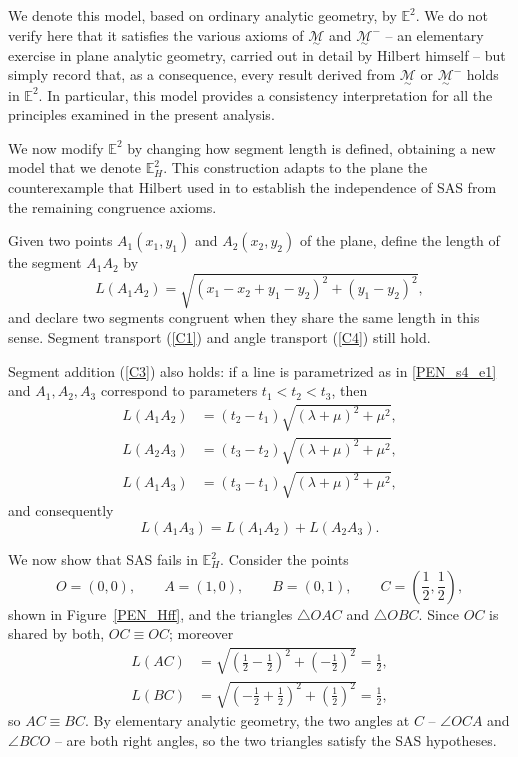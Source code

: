 \documentclass[11pt,a4paper]{article}
\theoremstyle{definition}
\theoremstyle{remark}
\numberwithin{equation}{section}
\newcommand{\MG}{\underset{\sim}{\mathcal{M}}} %
\begin{document}
We denote this model, based on ordinary analytic geometry, by $\mathbb{E}^{2}$. We do not
verify here that it satisfies the various axioms of $\MG$ and $\MG^{-}$ -- an elementary
exercise in plane analytic geometry, carried out in detail by Hilbert himself
\cite[\S 9]{Hilbert1950} -- but simply record that, as a consequence, every result derived
from $\MG$ or $\MG^{-}$ holds in $\mathbb{E}^{2}$.
In particular, this model provides a consistency interpretation for all the principles examined
in the present analysis.

We now modify $\mathbb{E}^{2}$ by changing how segment length is defined, obtaining a new model
that we denote $\mathbb{E}_{H}^{2}$. This construction adapts to the plane the counterexample
that Hilbert used in \cite[\S 11]{Hilbert1950} to establish the independence of SAS from the
remaining congruence axioms.

Given two points $A_{1}(x_{1},y_{1})$ and $A_{2}(x_{2},y_{2})$ of the plane, define the length
of the segment $A_1A_2$ by
\begin{equation*}
L(A_{1}A_{2})=
\sqrt{(x_{1}-x_{2}+y_{1}-y_{2})^{2}+(y_{1}-y_{2})^{2}},
\end{equation*}
and declare two segments congruent when they share the same length in this sense. Segment
transport (\ref{C1}) and angle transport (\ref{C4}) still hold.

Segment addition (\ref{C3}) also holds: if a line is parametrized as in \eqref{PEN_s4_e1} and
$A_1,A_2,A_3$ correspond to parameters $t_1<t_2<t_3$, then
\begin{align*}
L(A_{1}A_{2})&=(t_{2}-t_{1})\sqrt{(\lambda+\mu)^{2}+\mu^{2}},\\
L(A_{2}A_{3})&=(t_{3}-t_{2})\sqrt{(\lambda+\mu)^{2}+\mu^{2}},\\
L(A_{1}A_{3})&=(t_{3}-t_{1})\sqrt{(\lambda+\mu)^{2}+\mu^{2}},
\end{align*}
and consequently
\begin{equation*}
L(A_{1}A_{3})=L(A_{1}A_{2})+L(A_{2}A_{3}).
\end{equation*}

We now show that SAS fails in $\mathbb{E}_{H}^{2}$. Consider the points
\begin{equation*}
O=(0,0),\qquad
A=(1,0),\qquad
B=(0,1),\qquad
C=\left(\frac12,\frac12\right),
\end{equation*}
shown in Figure~\ref{PEN_Hff}, and the triangles $\triangle OAC$ and $\triangle OBC$. Since $OC$
is shared by both, $OC\equiv OC$; moreover
\begin{align*}
L(AC)&=\sqrt{\left(\frac12-\frac12\right)^2+\left(-\frac12\right)^2}
=\frac12,\\
L(BC)&=\sqrt{\left(-\frac12+\frac12\right)^2+\left(\frac12\right)^2}
=\frac12,
\end{align*}
so $AC\equiv BC$. By elementary analytic geometry, the two angles at $C$ -- $\angle OCA$ and
$\angle BCO$ -- are both right angles, so the two triangles satisfy the SAS hypotheses.
\end{document}
